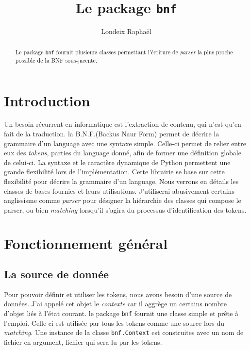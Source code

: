 \documentclass[a4paper]{article}
\title{Le package \texttt{bnf}}
\author{Londeix Raphaël}
\newcommand{\fixed}[1]{\texttt{#1}}
\newcommand{\bnf}{B.N.F.}
\begin{document}
    \maketitle

    \begin{abstract}
        Le package \fixed{bnf} fournit plusieurs classes permettant
        l'écriture de \textit{parser} la plus proche possible de la
        BNF sous-jacente.
    \end{abstract}

    \newpage
    \section{Introduction}
        Un besoin récurrent en informatique est l'extraction de contenu,
        qui n'est qu'en fait de la traduction. la \bnf (Backus Naur Form)
        permet de décrire la grammaire d'un language avec une syntaxe simple.
        Celle-ci permet de relier entre eux des \textit{tokens},
        parties du language donné, afin de former une définition globale
        de celui-ci. La syntaxe et le caractère dynamique de Python permettent
        une grande flexibilité lors de l'implémentation. Cette librairie se
        base sur cette flexibilité pour décrire la grammaire d'un language.
        Nous verrons en détails les classes de bases fournies et leurs
        utilisations. J'utiliserai
        abusivement certains anglissisme comme \emph{parser} pour désigner
        la hiérarchie des classes qui compose le parser, ou bien \emph{matching}
        lorsqu'il s'agira du processus d'identification des tokens.

    \newpage
    \section{Fonctionnement général}
        \subsection{La source de donnée}
            Pour pouvoir définir et utiliser les tokens, nous avons besoin d'une
            source de données. J'ai appelé cet objet le \emph{contexte} car
            il aggrège un certains nombre d'objet liés à l'état courant. le
            package \fixed{bnf} fournit une classe simple et prête à l'emploi.
            Celle-ci est utilisée par tous les tokens comme une source lors
            du \textit{matching}. Une instance de la classe \fixed{bnf.Context} est
            construites avec un nom de fichier en argument, fichier qui sera
            lu par les tokens.
\end{document}

